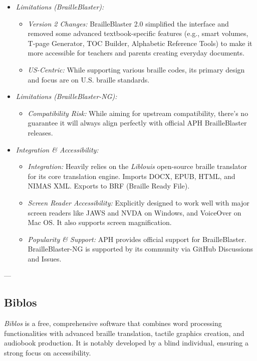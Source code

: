 \begin{itemize}
\begin{itemize}
    \end{itemize}
    \item \emph{Limitations (BrailleBlaster):}
    \begin{itemize}
        \item \emph{Version 2 Changes:} BrailleBlaster 2.0 simplified the interface and removed some advanced textbook-specific features (e.g., smart volumes, T-page Generator, TOC Builder, Alphabetic Reference Tools) to make it more accessible for teachers and parents creating everyday documents.
        \item \emph{US-Centric:} While supporting various braille codes, its primary design and focus are on U.S. braille standards.
    \end{itemize}
    \item \emph{Limitations (BrailleBlaster-NG):}
    \begin{itemize}
        \item \emph{Compatibility Risk:} While aiming for upstream compatibility, there's no guarantee it will always align perfectly with official APH BrailleBlaster releases.
    \end{itemize}
    \item \emph{Integration \& Accessibility:}
    \begin{itemize}
        \item \emph{Integration:} Heavily relies on the \emph{Liblouis} open-source braille translator for its core translation engine. Imports DOCX, EPUB, HTML, and NIMAS XML. Exports to BRF (Braille Ready File).
        \item \emph{Screen Reader Accessibility:} Explicitly designed to work well with major screen readers like JAWS and NVDA on Windows, and VoiceOver on Mac OS. It also supports screen magnification.
        \item \emph{Popularity \& Support:} APH provides official support for BrailleBlaster. BrailleBlaster-NG is supported by its community via GitHub Discussions and Issues.
    \end{itemize}
\end{itemize}

---

\subsection{Biblos}
\emph{Biblos} is a free, comprehensive software that combines word processing functionalities with advanced braille translation, tactile graphics creation, and audiobook production. It is notably developed by a blind individual, ensuring a strong focus on accessibility.

